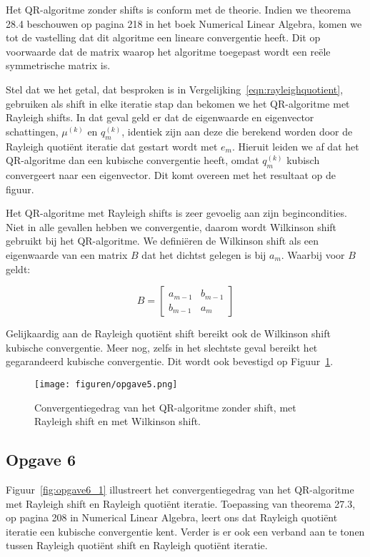 \documentclass[a4paper, 12pt, titlepage]{report}
\begin{document}
Het QR-algoritme zonder shifts is conform met de theorie. Indien we theorema 28.4 beschouwen op pagina 218 in het boek Numerical Linear Algebra, komen we tot de vastelling dat dit algoritme een lineare convergentie heeft. Dit op voorwaarde dat de matrix waarop het algoritme toegepast wordt een re\"ele symmetrische matrix is.

Stel dat we het getal, dat besproken is in Vergelijking~\ref{eqn:rayleighquotient}, gebruiken als shift in elke iteratie stap dan bekomen we het QR-algoritme met Rayleigh shifts. In dat geval geld er dat de eigenwaarde en eigenvector schattingen, $\mu^{(k)}$ en $q^{(k)}_m$, identiek zijn aan deze die berekend worden door de Rayleigh quoti\"ent iteratie dat gestart wordt met $e_m$. Hieruit leiden we af dat het QR-algoritme dan een kubische convergentie heeft, omdat $q^{(k)}_m$ kubisch convergeert naar een eigenvector. Dit komt overeen met het resultaat op de figuur.

Het QR-algoritme met Rayleigh shifts is zeer gevoelig aan zijn begincondities. Niet in alle gevallen hebben we convergentie, daarom wordt Wilkinson shift gebruikt bij het QR-algoritme. We defini\"eren de Wilkinson shift als een eigenwaarde van een matrix $B$ dat het dichtst gelegen is bij $a_m$. Waarbij voor $B$ geldt:

\begin{equation}
B = \begin{bmatrix} a_{m-1} & b_{m-1} \\ b_{m-1} & a_m \end{bmatrix}
\end{equation}

Gelijkaardig aan de Rayleigh quoti\"ent shift bereikt ook de Wilkinson shift kubische convergentie. Meer nog, zelfs in het slechtste geval bereikt het gegarandeerd kubische convergentie. Dit wordt ook bevestigd op Figuur~\ref{fig:opgave5}.

\begin{figure}[htb]
	\centering
	\texttt{[image: figuren/opgave5.png]}
	\caption{Convergentiegedrag van het QR-algoritme zonder shift, met Rayleigh shift en met Wilkinson shift.}
	\label{fig:opgave5}
\end{figure}


\subsection{Opgave 6}
Figuur~\ref{fig:opgave6_1} illustreert het convergentiegedrag van het QR-algoritme met Rayleigh shift en Rayleigh quoti\"ent iteratie. Toepassing van theorema 27.3, op pagina 208 in Numerical Linear Algebra, leert ons dat Rayleigh quoti\"ent iteratie een kubische convergentie kent. Verder is er ook een verband aan te tonen tussen Rayleigh quoti\"ent shift en Rayleigh quoti\"ent iteratie.
\end{document}
